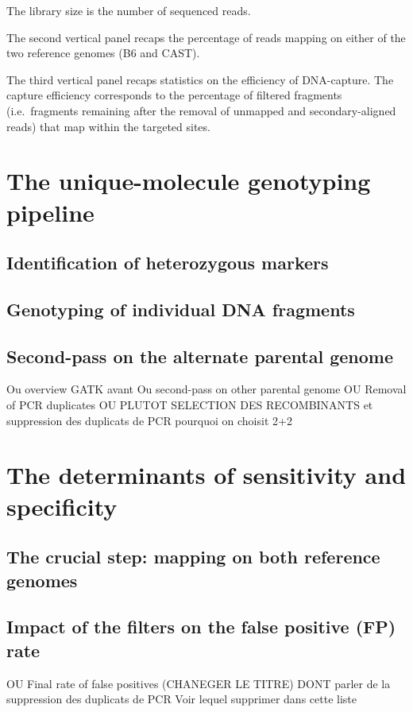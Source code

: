 \begin{sidewaystable}[p]
{		The library size is the number of sequenced reads.
		\par The second vertical panel recaps the percentage of reads mapping on either of the two reference genomes (B6 and CAST).
		\par The third vertical panel recaps statistics on the efficiency of DNA-capture.
		The capture efficiency corresponds to the percentage of filtered fragments (i.e.\ fragments remaining after the removal of unmapped and secondary-aligned reads) that map within the targeted sites.
	}
\label{tab:characteristics-seq-mapping-capture}
\end{sidewaystable}





\section{The unique-molecule genotyping pipeline}
\subsection{Identification of heterozygous markers}


\subsection{Genotyping of individual DNA fragments}
\subsection{Second-pass on the alternate parental genome} Ou overview GATK avant Ou second-pass on other parental genome OU Removal of PCR duplicates OU PLUTOT SELECTION DES RECOMBINANTS et suppression des duplicats de PCR
pourquoi on choisit 2+2

\section{The determinants of sensitivity and specificity}
\subsection{The crucial step: mapping on both reference genomes}
\subsection{Impact of the filters on the false positive (FP) rate} OU Final rate of false positives  (CHANEGER LE TITRE)
DONT parler de la suppression des duplicats de PCR
Voir lequel supprimer dans cette liste


